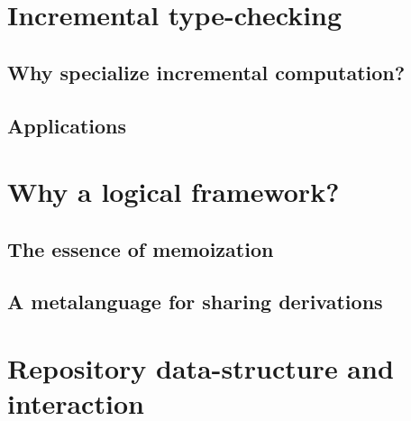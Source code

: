 \documentclass[preprint]{sigplanconf}
\newcommand\rem[2]{\textcolor{Mahogany}{{\textsf{#1}} $\triangleright$
    \textsl{#2}}}
\newcommand\yrem[1]{\rem{Y}{#1}}
\begin{document}



\section{Incremental type-checking} %


\subsection{Why specialize incremental computation?}

\subsection{Applications}

\section{Why a logical framework?} %

\subsection{The essence of memoization}

\subsection{A metalanguage for sharing derivations}



\section{Repository data-structure and interaction}
\end{document}
